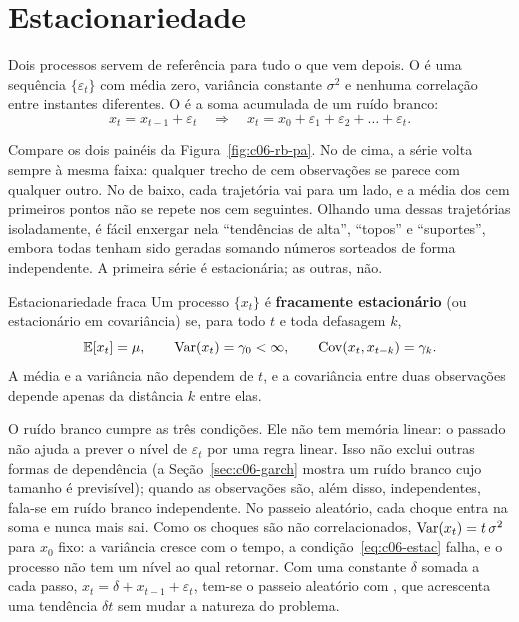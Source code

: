 \section{Estacionariedade}
\label{sec:c06-estac}

Dois processos servem de referência para tudo o que vem depois. O  é uma sequência $\{\varepsilon_t\}$ com média zero, variância constante $\sigma^2$ e nenhuma correlação entre instantes diferentes. O  é a soma acumulada de um ruído branco:
\begin{equation}
  x_t = x_{t-1} + \varepsilon_t \quad\Longrightarrow\quad x_t = x_0 + \varepsilon_1 + \varepsilon_2 + \dots + \varepsilon_t .
  \label{eq:c06-passeio}
\end{equation}


Compare os dois painéis da Figura~\ref{fig:c06-rb-pa}. No de cima, a série volta sempre à mesma faixa: qualquer trecho de cem observações se parece com qualquer outro. No de baixo, cada trajetória vai para um lado, e a média dos cem primeiros pontos não se repete nos cem seguintes. Olhando uma dessas trajetórias isoladamente, é fácil enxergar nela ``tendências de alta'', ``topos'' e ``suportes'', embora todas tenham sido geradas somando números sorteados de forma independente. A primeira série é estacionária; as outras, não.

\begin{definicao}{Estacionariedade fraca}
Um processo $\{x_t\}$ é \textbf{fracamente estacionário} (ou estacionário em covariância) se, para todo $t$ e toda defasagem $k$,
\begin{equation}
  \operatorname{\mathbb{E}}[x_t] = \mu , \qquad \operatorname{Var}(x_t) = \gamma_0 < \infty , \qquad \operatorname{Cov}(x_t, x_{t-k}) = \gamma_k .
  \label{eq:c06-estac}
\end{equation}
A média e a variância não dependem de $t$, e a covariância entre duas observações depende apenas da distância $k$ entre elas.
\end{definicao}

O ruído branco cumpre as três condições. Ele não tem memória linear: o passado não ajuda a prever o nível de $\varepsilon_t$ por uma regra linear. Isso não exclui outras formas de dependência (a Seção~\ref{sec:c06-garch} mostra um ruído branco cujo tamanho é previsível); quando as observações são, além disso, independentes, fala-se em ruído branco independente. No passeio aleatório, cada choque entra na soma e nunca mais sai. Como os choques são não correlacionados, $\operatorname{Var}(x_t) = t\,\sigma^2$ para $x_0$ fixo: a variância cresce com o tempo, a condição~\eqref{eq:c06-estac} falha, e o processo não tem um nível ao qual retornar. Com uma constante $\delta$ somada a cada passo, $x_t = \delta + x_{t-1} + \varepsilon_t$, tem-se o passeio aleatório com , que acrescenta uma tendência $\delta t$ sem mudar a natureza do problema.

